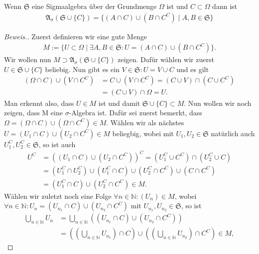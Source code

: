 \begin{lemma}
    Wenn $\mathfrak{S}$ eine Sigmaalgebra über der Grundmenge $\Omega$ ist und $C \subset \Omega$ dann ist
    \begin{align*}
        \mathfrak{A}_\sigma(\mathfrak{S} \cup \{C\})=\{(A\cap C)\cup(B \cap C^C)\mid A,B \in \mathfrak{S}\}
    \end{align*}
\end{lemma}

\begin{proof}[Beweis.]
    Zuerst definieren wir eine gute Menge 
    \begin{align*}
        M:=\{U\subset\Omega\mid \exists A,B \in \mathfrak{S}: U = (A\cap C)\cup (B\cap C^C)\}.
    \end{align*}
    Wir wollen nun $M\supset\mathfrak{A}_\sigma(\mathfrak{S}\cup \{C\})$ zeigen. Dafür wählen wir zuerst $U\in \mathfrak{S}\cup\{C\}$ beliebig. Nun gibt es ein $V\in \mathfrak{S}:U=V\cup C$ und es gilt
    \begin{align*}
        (\Omega\cap C)\cup(V\cap C^C)&=C\cup(V\cap C^C) = (C\cup V)\cap(C\cup C^C)\\
        &=(C\cup V)\cap\Omega = U.
    \end{align*}
    Man erkennt also, dass $U\in M$ ist und damit $\mathfrak{S}\cup\{C\}\subset M$. Nun wollen wir noch zeigen, dass M eine $\sigma$-Algebra ist. Dafür sei zuerst bemerkt, dass $\Omega=(\Omega\cap C)\cup(\Omega\cap C^C)\in M$. Wählen wir als nächstes $U=(U_1\cap C)\cup(U_2\cap C^C)\in M$ beliegbig, wobei mit $U_1,U_2\in\mathfrak{S}$ natürlich auch $U_1^C,U_2^C\in\mathfrak{S}$, so ist auch
    \begin{align*}
        U^C&=((U_1\cap C)\cup(U_2\cap C^C))^C=(U_1^C\cup C^C)\cap(U_2^C\cup C)\\
        &=(U_1^C\cap U_2^C)\cup(U_1^C\cap C)\cup(U_2^C\cap C^C)\cup(C\cap C^C)\\
        &=(U_1^C\cap C)\cup(U_2^C\cap C^C)\in M.
    \end{align*}
    Wählen wir zuletzt noch eine Folge $\forall n\in\mathbb{N}:(U_n)\in M$, wobei $\forall n\in\mathbb{N}:U_n=(U_{n_1}\cap C)\cup(U_{n_2}\cap C^C)$ mit $U_{n_1},U_{n_2}\in\mathfrak{S}$, so ist
    \begin{align*}
        \bigcup_{n\in\mathbb{N}}U_n&=\bigcup_{n\in\mathbb{N}}((U_{n_1}\cap C)\cup(U_{n_2}\cap C^C))\\
        &= \left(\left(\bigcup_{n\in\mathbb{N}}U_{n_1}\right)\cap C\right)\cup\left(\left(\bigcup_{n\in\mathbb{N}}U_{n_2}\right)\cap C^C\right)\in M,

\end{align*}
\end{proof}
